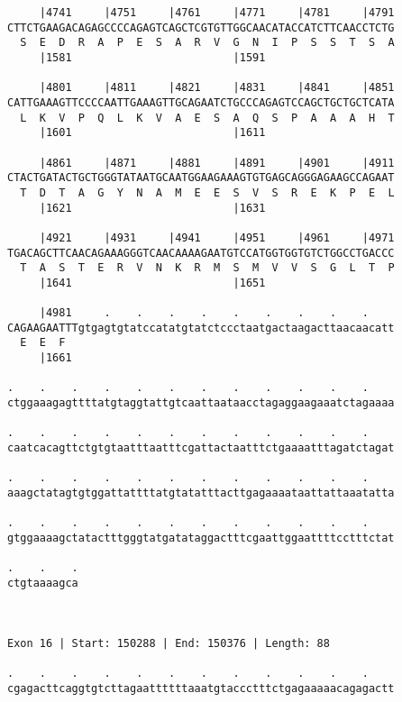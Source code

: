 \documentclass{article}
\begin{document}
\begin{Verbatim}
     |4741     |4751     |4761     |4771     |4781     |4791
CTTCTGAAGACAGAGCCCCAGAGTCAGCTCGTGTTGGCAACATACCATCTTCAACCTCTG
  S  E  D  R  A  P  E  S  A  R  V  G  N  I  P  S  S  T  S  A
     |1581                         |1591                    
  
     |4801     |4811     |4821     |4831     |4841     |4851
CATTGAAAGTTCCCCAATTGAAAGTTGCAGAATCTGCCCAGAGTCCAGCTGCTGCTCATA
  L  K  V  P  Q  L  K  V  A  E  S  A  Q  S  P  A  A  A  H  T
     |1601                         |1611                    
  
     |4861     |4871     |4881     |4891     |4901     |4911
CTACTGATACTGCTGGGTATAATGCAATGGAAGAAAGTGTGAGCAGGGAGAAGCCAGAAT
  T  D  T  A  G  Y  N  A  M  E  E  S  V  S  R  E  K  P  E  L
     |1621                         |1631                    
  
     |4921     |4931     |4941     |4951     |4961     |4971
TGACAGCTTCAACAGAAAGGGTCAACAAAAGAATGTCCATGGTGGTGTCTGGCCTGACCC
  T  A  S  T  E  R  V  N  K  R  M  S  M  V  V  S  G  L  T  P
     |1641                         |1651                    
  
     |4981     .    .    .    .    .    .    .    .    .    
CAGAAGAATTTgtgagtgtatccatatgtatctccctaatgactaagacttaacaacatt
  E  E  F                                                   
     |1661                                                  
  
.    .    .    .    .    .    .    .    .    .    .    .    
ctggaaagagttttatgtaggtattgtcaattaataacctagaggaagaaatctagaaaa
                                                            
.    .    .    .    .    .    .    .    .    .    .    .    
caatcacagttctgtgtaatttaatttcgattactaatttctgaaaatttagatctagat
                                                            
.    .    .    .    .    .    .    .    .    .    .    .    
aaagctatagtgtggattattttatgtatatttacttgagaaaataattattaaatatta
                                                            
.    .    .    .    .    .    .    .    .    .    .    .    
gtggaaaagctatactttgggtatgatataggactttcgaattggaattttcctttctat
                                                            
.    .    .
ctgtaaaagca
           
           
 
Exon 16 | Start: 150288 | End: 150376 | Length: 88
 
.    .    .    .    .    .    .    .    .    .    .    .    
cgagacttcaggtgtcttagaattttttaaatgtaccctttctgagaaaaacagagactt
                                                            

\end{Verbatim}
\end{document}

